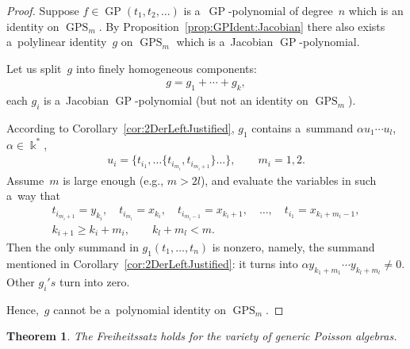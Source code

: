 \documentclass[11pt]{article}
\newtheorem{theorem}{Theorem}
\begin{document}
\begin{proof}
Suppose $f \in \operatorname{GP}(t_1,t_2,\dots)$ is a~$\operatorname{GP}$-polynomial of degree~$n$ which is an identity on $\operatorname{GPS}_{m}$.
By Proposition~\ref{prop:GPIdent:Jacobian} there also exists a~polylinear identity~$g$ on $\operatorname{GPS}_{m}$ which is a~Jacobian
$\operatorname{GP}$-polynomial.

Let us split~$g$ into f\/inely homogeneous components:
\begin{gather*}
g = g_1 + \cdots + g_k,
\end{gather*}
each $g_i$ is a~Jacobian $\operatorname{GP}$-polynomial (but not an identity on $\operatorname{GPS}_{m}$).

According to Corollary~\ref{cor:2DerLeftJustified}, $g_1$ contains a~summand $\alpha u_1\cdots u_l$, $\alpha \in
\Bbbk^*$,
\begin{gather*}
u_i = \{t_{i_1}, \dots \{t_{i_{m_i}}, t_{i_{m_i+1}} \}\dots \},
\qquad
m_i=1,2.
\end{gather*}
Assume~$m$ is large enough (e.g., $m>2 l$), and evaluate the variables in such a~way that
\begin{gather*}
t_{i_{m_i+1}} = y_{k_i},
\quad
t_{i_{m_i}}=x_{k_i},
\quad
t_{i_{m_i-1}}=x_{k_i+1},\quad \dots,\quad  t_{i_1}=x_{k_i+m_i-1},
\\
k_{i+1}\ge k_i+m_i,
\qquad
k_l+m_l<m.
\end{gather*}
Then the only summand in $g_1(t_1,\dots, t_n) $ is nonzero, namely, the summand mentioned in
Corollary~\ref{cor:2DerLeftJustified}: it turns into $\alpha y_{k_1+m_1}\cdots y_{k_l+m_l} \ne 0$.
Other $g_i's$ turn into zero.

Hence,~$g$ cannot be a~polynomial identity on $\operatorname{GPS}_{m}$.
\end{proof}

\begin{theorem}
The Freiheitssatz holds for the variety of generic Poisson algebras.
\end{theorem}
\end{document}
